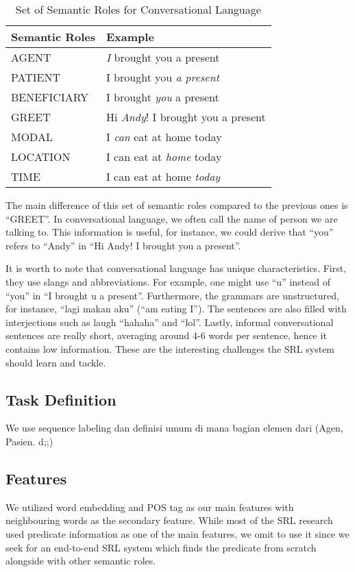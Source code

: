 \begin{table}
	\caption{Set of Semantic Roles for Conversational Language}
	\label{tab:semantic_roles}
	\begin{tabular}{ll}
		\toprule
		Semantic Roles		&Example\\
		\midrule
		AGENT				& \emph{I} brought you a present\\
		PATIENT				& I brought you \emph{a present}\\
		BENEFICIARY			& I brought \emph{you} a present\\
		GREET 				& Hi \emph{Andy}! I brought you a present\\
		MODAL 				& I \emph{can} eat at home today \\
		LOCATION 			& I can eat at \emph{home} today \\
		TIME 				& I can eat at home \emph{today} \\
		\bottomrule
	\end{tabular}
\end{table}

The main difference of this set of semantic roles compared to the previous ones is “GREET”. In conversational language, we often call the name of person we are talking to. This information is useful, for instance, we could derive that “you” refers to “Andy” in “Hi Andy! I brought you a present”.

It is worth to note that conversational language has unique characteristics. First, they use slangs and abbreviations. For example, one might use “u” instead of “you” in “I brought u a present”. Furthermore, the grammars are unstructured, for instance, “lagi makan aku” (“am eating I”). The sentences are also filled with interjections such as laugh “hahaha” and “lol”. Lastly, informal conversational sentences are really short, averaging around 4-6 words per sentence, hence it contains low information. These are the interesting challenges the SRL system should learn and tackle.

\subsection{Task Definition}
We use sequence labeling dan definisi umum di mana bagian elemen dari (Agen, Pasien. d;;)

\subsection{Features}
We utilized word embedding and POS tag as our main features with neighbouring words as the secondary feature. While most of the SRL research used predicate information as one of the main features, we omit to use it since we seek for an end-to-end SRL system which finds the predicate from scratch alongside with other semantic roles.

